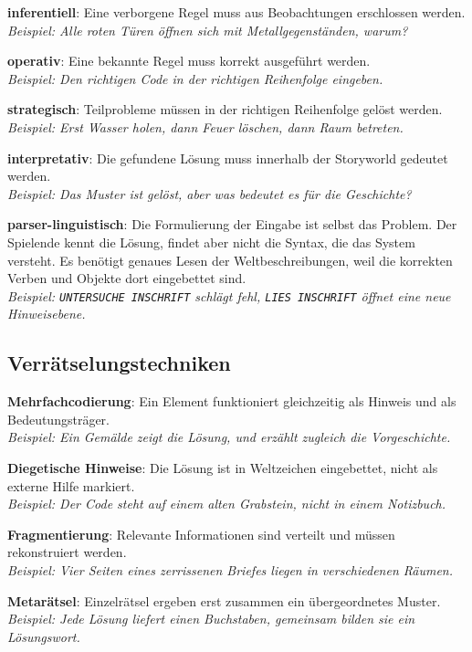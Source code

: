 \documentclass[parskip=half,a4paper,11pt]{scrreprt}
\begin{document}
\textbf{inferentiell}: Eine verborgene Regel muss aus Beobachtungen erschlossen werden.\\
\textit{Beispiel: Alle roten Türen öffnen sich mit Metallgegenständen, warum?}

\textbf{operativ}: Eine bekannte Regel muss korrekt ausgeführt werden.\\
\textit{Beispiel: Den richtigen Code in der richtigen Reihenfolge eingeben.}

\textbf{strategisch}: Teilprobleme müssen in der richtigen Reihenfolge gelöst werden. \\
\textit{Beispiel: Erst Wasser holen, dann Feuer löschen, dann Raum betreten.}

\textbf{interpretativ}: Die gefundene Lösung muss innerhalb der Storyworld gedeutet werden. \\
\textit{Beispiel: Das Muster ist gelöst, aber was bedeutet es für die Geschichte?}

\textbf{parser-linguistisch}: Die Formulierung der Eingabe ist selbst das Problem. Der Spielende kennt die Lösung, findet aber nicht die Syntax, die das System versteht. Es benötigt genaues Lesen der Weltbeschreibungen, weil die korrekten Verben und Objekte dort eingebettet sind. \\
\textit{Beispiel: \texttt{UNTERSUCHE INSCHRIFT} schlägt fehl, \texttt{LIES INSCHRIFT} öffnet eine neue Hinweisebene.}

\subsection{Verrätselungstechniken}

\textbf{Mehrfachcodierung}: Ein Element funktioniert gleichzeitig als Hinweis und als Bedeutungsträger.  \\
\textit{Beispiel: Ein Gemälde zeigt die Lösung, und erzählt zugleich die Vorgeschichte.}

\textbf{Diegetische Hinweise}: Die Lösung ist in Weltzeichen eingebettet, nicht als externe Hilfe markiert. \\
\textit{Beispiel: Der Code steht auf einem alten Grabstein, nicht in einem Notizbuch.}

\textbf{Fragmentierung}: Relevante Informationen sind verteilt und müssen rekonstruiert werden. \\
\textit{Beispiel: Vier Seiten eines zerrissenen Briefes liegen in verschiedenen Räumen.}

\textbf{Metarätsel}: Einzelrätsel ergeben erst zusammen ein übergeordnetes Muster. \\
\textit{Beispiel: Jede Lösung liefert einen Buchstaben, gemeinsam bilden sie ein Lösungswort.}
\end{document}
